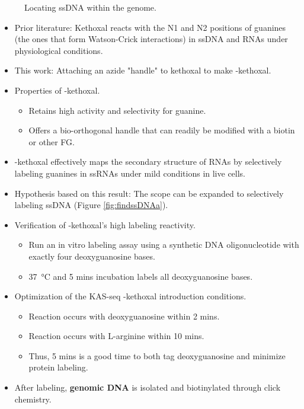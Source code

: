 \documentclass[../notes.tex]{subfiles}
\begin{document}
\begin{itemize}
\begin{figure}[h!]
        \caption{Locating ssDNA within the genome.}
        \label{fig:findssDNA}
    \end{figure}
    \begin{itemize}
        \item Prior literature: Kethoxal reacts with the N1 and N2 positions of guanines (the ones that form Watson-Crick interactions) in ssDNA and RNAs under physiological conditions.
        \item This work: Attaching an azide "handle" to kethoxal to make -kethoxal.
        \item Properties of -kethoxal.
        \begin{itemize}
            \item Retains high activity and selectivity for guanine.
            \item Offers a bio-orthogonal handle that can readily be modified with a biotin or other FG.
        \end{itemize}
        \item {}-kethoxal effectively maps the secondary structure of RNAs by selectively labeling guanines in ssRNAs under mild conditions in live cells.
        \item Hypothesis based on this result: The scope can be expanded to selectively labeling ssDNA (Figure \ref{fig:findssDNAa}).
        \item Verification of -kethoxal's high labeling reactivity.
        \begin{itemize}
            \item Run an in vitro labeling assay using a synthetic DNA oligonucleotide with exactly four deoxyguanosine bases.
            \item \SI{37}{\celsius} and 5 mins incubation labels all deoxyguanosine bases.
        \end{itemize}
        \item Optimization of the KAS-seq -kethoxal introduction conditions.
        \begin{itemize}
            \item Reaction occurs with deoxyguanosine within 2 mins.
            \item Reaction occurs with L-arginine within 10 mins.
            \item Thus, 5 mins is a good time to both tag deoxyguanosine and minimize protein labeling.
        \end{itemize}
        \item After labeling, \textbf{genomic DNA} is isolated and biotinylated through click chemistry.

\end{itemize}
\end{itemize}
\end{document}
